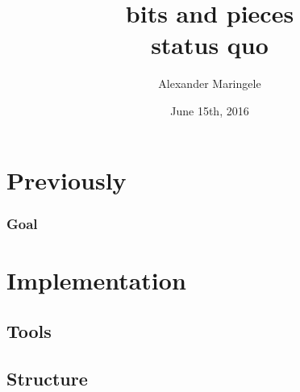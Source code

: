 



\author{Alexander Maringele}
\title{bits and pieces\\
	status quo
}
\date{June 15th, 2016}

%



 

\frame{\tableofcontents}

%

%





%

\section{Previously}

\begin{frame}
	\frametitle{Goal}
	


\end{frame}



\section{Implementation}

\subsection{Tools}

\subsection{Structure}




